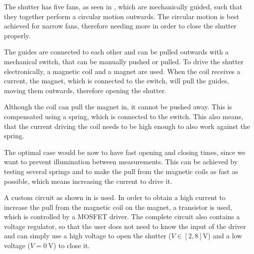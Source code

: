 The shutter has five fans, as seen in , which are mechanically guided, such that they together perform a circular motion outwards. The circular motion is best achieved for narrow fans, therefore needing more in order to close the shutter properly.

The guides are connected to each other and can be pulled outwards with a mechanical switch, that can be manually pushed or pulled. To drive the shutter electronically, a magnetic coil and a magnet are used. When the coil receives a current, the magnet, which is connected to the switch, will pull the guides, moving them outwards, therefore opening the shutter.

Although the coil can pull the magnet in, it cannot be pushed away. This is compensated using a spring, which is connected to the switch. This also means, that the current driving the coil needs to be high enough to also work against the spring.

The optimal case would be now to have fast opening and closing times, since we want to prevent illumination between measurements. This can be achieved by testing several springs and to make the pull from the magnetic coils as fast as possible, which means increasing the current to drive it.

A custom circuit as shown in  is used. In order to obtain a high current to increase the pull from the magnetic coil on the magnet, a transistor is used, which is controlled by a MOSFET driver. The complete circuit also contains a voltage regulator, so that the user does not need to know the input of the driver and can simply use a high voltage to open the shutter ($V\in\left[2,8\right]\mathrm{V}$) and a low voltage ($V=\SI{0}{\volt}$) to close it.


